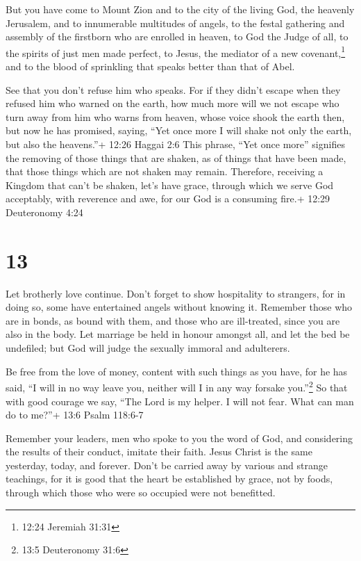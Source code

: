  But you have come to Mount Zion and to the city of the
living God, the heavenly Jerusalem, and to innumerable multitudes of
angels,  to the festal gathering and assembly of the
firstborn who are enrolled in heaven, to God the Judge of all, to the
spirits of just men made perfect,  to Jesus, the mediator
of a new covenant,\footnote{12:24 Jeremiah 31:31} and to the blood of
sprinkling that speaks better than that of Abel.

 See that you don't refuse him who speaks. For if they
didn't escape when they refused him who warned on the earth, how much
more will we not escape who turn away from him who warns from heaven,
 whose voice shook the earth then, but now he has promised,
saying, ``Yet once more I will shake not only the earth, but also the
heavens.''+ 12:26 Haggai 2:6  This phrase, ``Yet once
more'' signifies the removing of those things that are shaken, as of
things that have been made, that those things which are not shaken may
remain.  Therefore, receiving a Kingdom that can't be
shaken, let's have grace, through which we serve God acceptably, with
reverence and awe,  for our God is a consuming fire.+ 12:29
Deuteronomy 4:24

\hypertarget{section-12}{%
\section{13}\label{section-12}}

 Let brotherly love continue.  Don't forget to
show hospitality to strangers, for in doing so, some have entertained
angels without knowing it.  Remember those who are in bonds,
as bound with them, and those who are ill-treated, since you are also in
the body.  Let marriage be held in honour amongst all, and
let the bed be undefiled; but God will judge the sexually immoral and
adulterers.

 Be free from the love of money, content with such things as
you have, for he has said, ``I will in no way leave you, neither will I
in any way forsake you.''\footnote{13:5 Deuteronomy 31:6} 
So that with good courage we say, ``The Lord is my helper. I will not
fear. What can man do to me?''+ 13:6 Psalm 118:6-7

 Remember your leaders, men who spoke to you the word of
God, and considering the results of their conduct, imitate their faith.
 Jesus Christ is the same yesterday, today, and forever.
 Don't be carried away by various and strange teachings, for
it is good that the heart be established by grace, not by foods, through
which those who were so occupied were not benefitted.

